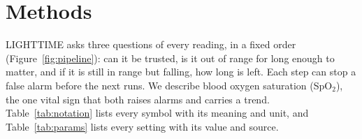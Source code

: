 \section{Methods}\label{sec:methods}



LIGHTTIME asks three questions of every reading, in a fixed order (Figure~\ref{fig:pipeline}): can it be trusted, is it out of range for long enough to matter, and if it is still in range but falling, how long is left. Each step can stop a false alarm before the next runs. We describe blood oxygen saturation (SpO$_2$), the one vital sign that both raises alarms and carries a trend. Table~\ref{tab:notation} lists every symbol with its meaning and unit, and Table~\ref{tab:params} lists every setting with its value and source.

